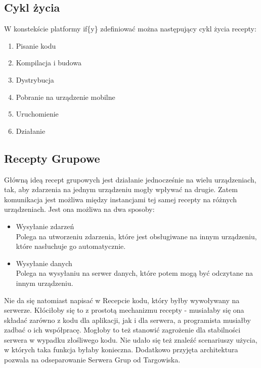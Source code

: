 \documentclass[11pt,a4paper,polish,thesis]{dcsbook}
\begin{document}
\subsection{Cykl życia}
W konstekście platformy if\{y\} zdefiniować można następujący cykl życia recepty:
\begin{enumerate}
\item Pisanie kodu
\item Kompilacja i budowa
\item Dystrybucja
\item Pobranie na urządzenie mobilne
\item Uruchomienie
\item Działanie
\end{enumerate}

\subsection{Recepty Grupowe}
Główną ideą recept grupowych jest działanie jednocześnie na wielu urządzeniach, tak, aby zdarzenia na jednym urządzeniu mogły wpływać na drugie. Zatem komunikacja jest możliwa między instancjami  tej samej recepty na różnych urządzeniach. Jest ona możliwa na dwa sposoby:
\begin{itemize}
\item{Wysyłanie zdarzeń}\\
Polega na utworzeniu zdarzenia, które jest obsługiwane na innym urządzeniu, które nasłuchuje go automatycznie.
\item{Wysyłanie danych}\\
Polega na wysyłaniu na serwer danych, które potem mogą być odczytane na innym urządzeniu.
\end{itemize}
Nie da się natomiast napisać w Recepcie kodu, który byłby wywoływany na serwerze. Kłóciłoby się to z prostotą mechanizmu recepty - musiałaby się ona składać zarówno z kodu dla aplikacji, jak i dla serwera, a programista musiałby zadbać o ich współpracę. Mogłoby to też stanowić zagrożenie dla stabilności serwera w wypadku złośliwego kodu.
Nie udało się też znaleźć scenariuszy użycia, w których taka funkcja byłaby konieczna. Dodatkowo przyjęta architektura pozwala na odseparowanie Serwera Grup od Targowiska. 
\end{document}
